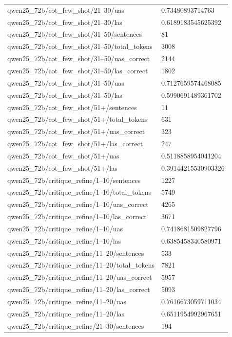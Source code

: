 \begin{tabular}{ll}
qwen25\_72b/cot\_few\_shot/21–30/uas & 0.73480893714763 \\
qwen25\_72b/cot\_few\_shot/21–30/las & 0.6189183545625392 \\
qwen25\_72b/cot\_few\_shot/31–50/sentences & 81 \\
qwen25\_72b/cot\_few\_shot/31–50/total\_tokens & 3008 \\
qwen25\_72b/cot\_few\_shot/31–50/uas\_correct & 2144 \\
qwen25\_72b/cot\_few\_shot/31–50/las\_correct & 1802 \\
qwen25\_72b/cot\_few\_shot/31–50/uas & 0.7127659574468085 \\
qwen25\_72b/cot\_few\_shot/31–50/las & 0.5990691489361702 \\
qwen25\_72b/cot\_few\_shot/51+/sentences & 11 \\
qwen25\_72b/cot\_few\_shot/51+/total\_tokens & 631 \\
qwen25\_72b/cot\_few\_shot/51+/uas\_correct & 323 \\
qwen25\_72b/cot\_few\_shot/51+/las\_correct & 247 \\
qwen25\_72b/cot\_few\_shot/51+/uas & 0.5118858954041204 \\
qwen25\_72b/cot\_few\_shot/51+/las & 0.39144215530903326 \\
qwen25\_72b/critique\_refine/1–10/sentences & 1227 \\
qwen25\_72b/critique\_refine/1–10/total\_tokens & 5749 \\
qwen25\_72b/critique\_refine/1–10/uas\_correct & 4265 \\
qwen25\_72b/critique\_refine/1–10/las\_correct & 3671 \\
qwen25\_72b/critique\_refine/1–10/uas & 0.7418681509827796 \\
qwen25\_72b/critique\_refine/1–10/las & 0.6385458340580971 \\
qwen25\_72b/critique\_refine/11–20/sentences & 533 \\
qwen25\_72b/critique\_refine/11–20/total\_tokens & 7821 \\
qwen25\_72b/critique\_refine/11–20/uas\_correct & 5957 \\
qwen25\_72b/critique\_refine/11–20/las\_correct & 5093 \\
qwen25\_72b/critique\_refine/11–20/uas & 0.7616673059711034 \\
qwen25\_72b/critique\_refine/11–20/las & 0.6511954992967651 \\
qwen25\_72b/critique\_refine/21–30/sentences & 194 \\

\end{tabular}
